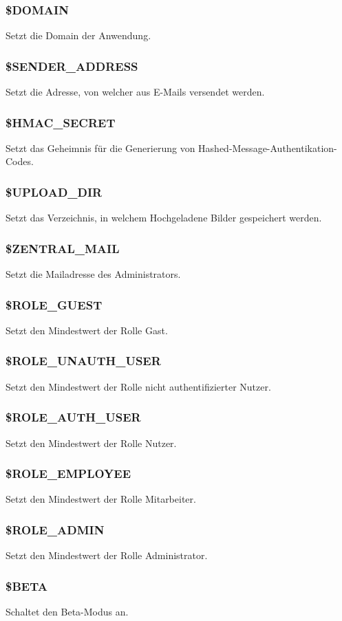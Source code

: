 \subsubsection{\$DOMAIN} Setzt die Domain der Anwendung.
\subsubsection{\$SENDER\_ADDRESS} Setzt die Adresse, von welcher aus E-Mails versendet werden.
\subsubsection{\$HMAC\_SECRET} Setzt das Geheimnis für die Generierung von Hashed-Message-Authentikation-Codes.
\subsubsection{\$UPLOAD\_DIR} Setzt das Verzeichnis, in welchem Hochgeladene Bilder gespeichert werden.
\subsubsection{\$ZENTRAL\_MAIL} Setzt die Mailadresse des Administrators.
\subsubsection{\$ROLE\_GUEST} Setzt den Mindestwert der Rolle {\glqq Gast\grqq}.
\subsubsection{\$ROLE\_UNAUTH\_USER} Setzt den Mindestwert der Rolle {\glqq nicht authentifizierter Nutzer\grqq}.
\subsubsection{\$ROLE\_AUTH\_USER} Setzt den Mindestwert der Rolle {\glqq Nutzer\grqq}.
\subsubsection{\$ROLE\_EMPLOYEE} Setzt den Mindestwert der Rolle {\glqq Mitarbeiter\grqq}.
\subsubsection{\$ROLE\_ADMIN} Setzt den Mindestwert der Rolle {\glqq Administrator\grqq}.
\subsubsection{\$BETA} Schaltet den Beta-Modus an.
